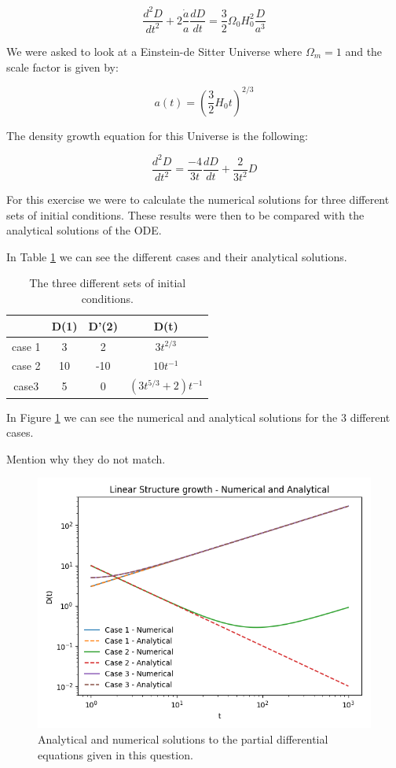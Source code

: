 \documentclass[a4paper,10pt]{article}
\begin{document}
\begin{equation}
\frac{d^2D}{d t^2} + 2\frac{\dot{a}}{a}\frac{dD}{dt} = \frac{3}{2}\Omega_0H_0^2\frac{D}{a^3}
\end{equation}

We were asked to look at a Einstein-de Sitter Universe where $\Omega_m = 1$ and the scale factor is given by: 

\begin{equation}
a(t) = (\frac{3}{2}H_0t)^{2/3}
\end{equation}

The density growth equation for this Universe is the following: 

\begin{equation}
\frac{d^2D}{dt^2} = \frac{-4}{3t} \frac{dD}{dt} + \frac{2}{3t^2} D
\end{equation}

For this exercise we were to calculate the numerical solutions for three different sets of initial conditions. These results were then to be compared with the analytical solutions of the ODE. 

In Table \ref{tab:3} we can see the different cases and their analytical solutions. 


\begin{table}[h!]
\begin{center}
\begin{tabular}{c|c|c|c}
 & D(1) & D'(2) & D(t) \\ 
\hline 
case 1 & 3 & 2 & $3t^{2/3}$ \\ 
case 2 & 10 & -10 & $10t^{-1}$ \\ 
case3 & 5 & 0 & $(3t^{5/3}+2)t^{-1}$ \\ 
\end{tabular} 
\label{tab:3}
\caption{The three different sets of initial conditions.}
\end{center}
\end{table}

In Figure \ref{fig:3} we can see the numerical and analytical solutions for the 3 different cases.

\color{red} Mention why they do not match. \color{black}

\begin{figure}[h!]
  \centering
  \includegraphics[width=0.8\linewidth]{./plots/3.png}
  \caption{Analytical and numerical solutions to the partial differential equations given in this question.}
  \label{fig:3}
\end{figure}
\end{document}
